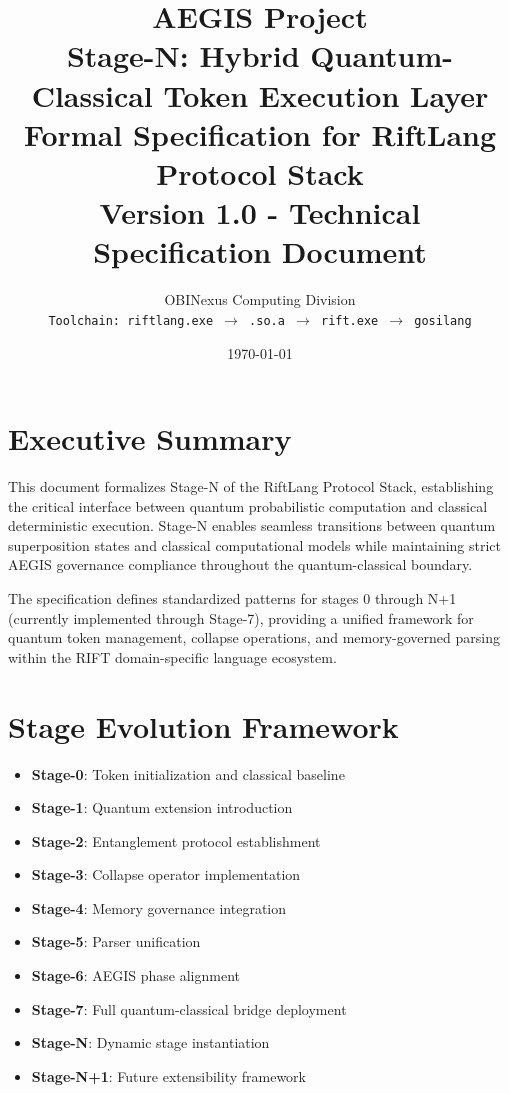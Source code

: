 \documentclass[12pt,a4paper]{article}
\title{
    \vspace{-2cm}
    \Large \textbf{AEGIS Project} \\
    \vspace{0.5cm}
    \Huge \textbf{Stage-N: Hybrid Quantum-Classical Token Execution Layer} \\
    \vspace{0.5cm}
    \Large \textbf{Formal Specification for RiftLang Protocol Stack} \\
    \vspace{0.5cm}
    \normalsize Version 1.0 - Technical Specification Document
}
\author{
    OBINexus Computing Division \\
    \texttt{Toolchain: riftlang.exe $\rightarrow$ .so.a $\rightarrow$ rift.exe $\rightarrow$ gosilang}
}
\date{\today}
\begin{document}
\maketitle
\thispagestyle{empty}

\newpage
\tableofcontents
\newpage

\section{Executive Summary}

This document formalizes Stage-N of the RiftLang Protocol Stack, establishing the critical interface between quantum probabilistic computation and classical deterministic execution. Stage-N enables seamless transitions between quantum superposition states and classical computational models while maintaining strict AEGIS governance compliance throughout the quantum-classical boundary.

The specification defines standardized patterns for stages 0 through N+1 (currently implemented through Stage-7), providing a unified framework for quantum token management, collapse operations, and memory-governed parsing within the RIFT domain-specific language ecosystem.

\section{Stage Evolution Framework}

\begin{tcolorbox}[colback=blue!5!white,colframe=quantumblue,title=Stage Progression Model]
\begin{itemize}
    \item \textbf{Stage-0}: Token initialization and classical baseline
    \item \textbf{Stage-1}: Quantum extension introduction
    \item \textbf{Stage-2}: Entanglement protocol establishment
    \item \textbf{Stage-3}: Collapse operator implementation
    \item \textbf{Stage-4}: Memory governance integration
    \item \textbf{Stage-5}: Parser unification
    \item \textbf{Stage-6}: AEGIS phase alignment
    \item \textbf{Stage-7}: Full quantum-classical bridge deployment
    \item \textbf{Stage-N}: Dynamic stage instantiation
    \item \textbf{Stage-N+1}: Future extensibility framework
\end{itemize}
\end{tcolorbox}
\end{document}
